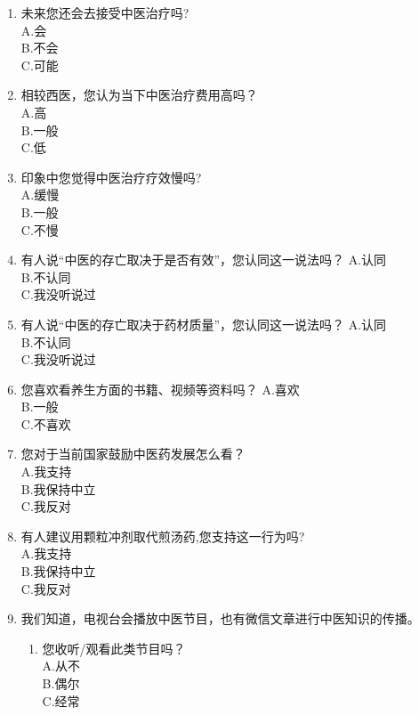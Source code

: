 \begin{enumerate}
\item 
未来您还会去接受中医治疗吗?\\
A.会\\
B.不会\\
C.可能

\item 
相较西医，您认为当下中医治疗费用高吗？\\
A.高\\
B.一般\\
C.低\\

\item 
印象中您觉得中医治疗疗效慢吗?\\
A.缓慢\\
B.一般\\
C.不慢\\

\item 
有人说“中医的存亡取决于是否有效”，您认同这一说法吗？
A.认同\\
B.不认同\\
C.我没听说过

\item 
有人说“中医的存亡取决于药材质量”，您认同这一说法吗？
A.认同\\
B.不认同\\
C.我没听说过

\item 您喜欢看养生方面的书籍、视频等资料吗？
A.喜欢\\
B.一般\\
C.不喜欢\\

\item 
您对于当前国家鼓励中医药发展怎么看？\\
A.我支持\\
B.我保持中立\\
C.我反对

\item 
有人建议用颗粒冲剂取代煎汤药,您支持这一行为吗?\\
A.我支持\\
B.我保持中立\\
C.我反对

\item 
我们知道，电视台会播放中医节目，也有微信文章进行中医知识的传播。
\begin{enumerate}
	\item 
   您收听/观看此类节目吗？\\
    A.从不\\
    B.偶尔\\
    C.经常


\end{enumerate}
\end{enumerate}
